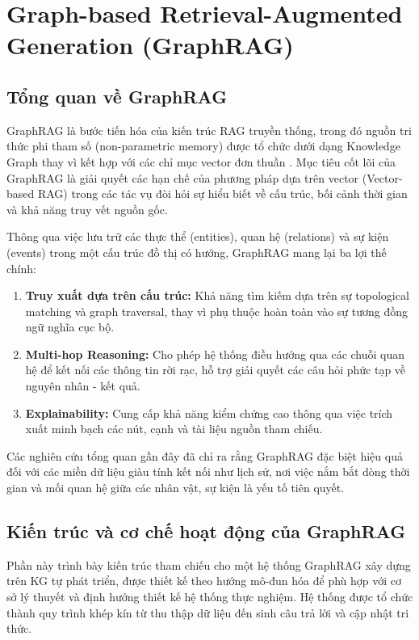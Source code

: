 \section{Graph-based Retrieval-Augmented Generation (GraphRAG)}

\subsection{Tổng quan về GraphRAG}
GraphRAG là bước tiến hóa của kiến trúc RAG truyền thống, trong đó nguồn tri thức phi tham số (non-parametric memory) được tổ chức dưới dạng Knowledge Graph thay vì kết hợp với các chỉ mục vector đơn thuần \cite{lewis2020rag}. Mục tiêu cốt lõi của GraphRAG là giải quyết các hạn chế của phương pháp dựa trên vector (Vector-based RAG) trong các tác vụ đòi hỏi sự hiểu biết về cấu trúc, bối cảnh thời gian và khả năng truy vết nguồn gốc.

Thông qua việc lưu trữ các thực thể (entities), quan hệ (relations) và sự kiện (events) trong một cấu trúc đồ thị có hướng, GraphRAG mang lại ba lợi thế chính:
\begin{enumerate}
    \item \textbf{Truy xuất dựa trên cấu trúc:} Khả năng tìm kiếm dựa trên sự topological matching và graph traversal, thay vì phụ thuộc hoàn toàn vào sự tương đồng ngữ nghĩa cục bộ.
    \item \textbf{Multi-hop Reasoning:} Cho phép hệ thống điều hướng qua các chuỗi quan hệ để kết nối các thông tin rời rạc, hỗ trợ giải quyết các câu hỏi phức tạp về nguyên nhân - kết quả.
    \item \textbf{Explainability:} Cung cấp khả năng kiểm chứng cao thông qua việc trích xuất minh bạch các nút, cạnh và tài liệu nguồn tham chiếu.
\end{enumerate}



Các nghiên cứu tổng quan gần đây \cite{graphrag_survey_2024, microsoft_graphrag} đã chỉ ra rằng GraphRAG đặc biệt hiệu quả đối với các miền dữ liệu giàu tính kết nối như lịch sử, nơi việc nắm bắt dòng thời gian và mối quan hệ giữa các nhân vật, sự kiện là yếu tố tiên quyết.

\subsection{Kiến trúc và cơ chế hoạt động của GraphRAG}
Phần này trình bày kiến trúc tham chiếu cho một hệ thống GraphRAG xây dựng trên KG tự phát triển, được thiết kế theo hướng mô-đun hóa để phù hợp với cơ sở lý thuyết và định hướng thiết kế hệ thống thực nghiệm.
Hệ thống được tổ chức thành quy trình khép kín từ thu thập dữ liệu đến sinh câu trả lời và cập nhật tri thức.

